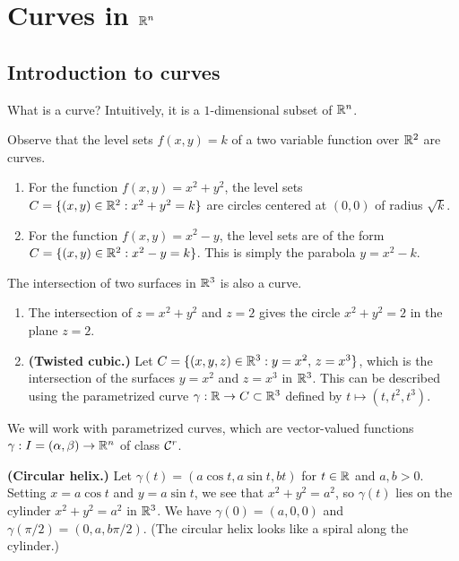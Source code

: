 \section{Curves in $\mathbb{R}^n$}\label{sec:2}

\subsection{Introduction to curves}\label{subsec:2.1}
What is a curve? Intuitively, it is a $1$-dimensional subset of $\mathbb{R}^n$. 

Observe that the level sets $f(x, y) = k$ of a two variable function over $\mathbb{R}^2$ are curves. 
\begin{enumerate}[(1)]
    \item For the function $f(x, y) = x^2 + y^2$, the level sets 
    $C = \{(x, y) \in \mathbb{R}^2 : x^2 + y^2 = k\}$ are circles centered at 
    $(0, 0)$ of radius $\sqrt{k}$. 
    \item For the function $f(x, y) = x^2 - y$, the level sets are of the form 
    $C = \{(x, y) \in \mathbb{R}^2 : x^2 - y = k\}$.
    This is simply the parabola $y = x^2 - k$.
\end{enumerate}

The intersection of two surfaces in $\mathbb{R}^3$ is also a curve. 
\begin{enumerate}[(1)]
    \item The intersection of $z = x^2 + y^2$ and $z = 2$ gives the circle 
    $x^2 + y^2 = 2$ in the plane $z = 2$. 

    \item {\bf (Twisted cubic.)} Let $C = \{(x, y, z) \in \mathbb{R}^3 : 
    y = x^2,\, z = x^3\}$, which is the intersection of the surfaces 
    $y = x^2$ and $z = x^3$ in $\mathbb{R}^3$. This can be described using the parametrized 
    curve $\gamma : \mathbb{R} \to C \subset \mathbb{R}^3$ defined by $t \mapsto (t, t^2, t^3)$.
\end{enumerate}

We will work with parametrized curves, which are 
vector-valued functions $\gamma : I = (\alpha, \beta) \to \mathbb{R}^n$ of class ${\cal C}^r$.

{\bf (Circular helix.)} Let $\gamma(t) = (a\cos t, a\sin t, bt)$ for $t \in \mathbb{R}$ and $a, b > 0$. 
Setting $x = a\cos t$ and $y = a\sin t$, we see that $x^2 + y^2 = a^2$, so 
$\gamma(t)$ lies on the cylinder $x^2 + y^2 = a^2$ in $\mathbb{R}^3$. 
We have $\gamma(0) = (a, 0, 0)$ and $\gamma(\pi/2) = (0, a, b\pi/2)$. (The circular helix 
looks like a spiral along the cylinder.)

